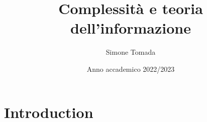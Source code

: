 \documentclass[a4paper,titlepage,oneside,11pt]{book}
\title{Complessità e teoria dell'informazione}
\author{Simone Tomada}
\date{Anno accademico 2022/2023}
\begin{document}
\maketitle

\chapter{Introduction}
\end{document}

